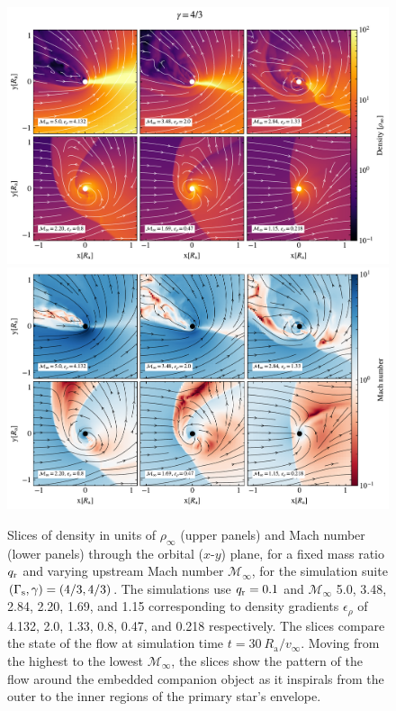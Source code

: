 \begin{figure}[t]%
\centering
\includegraphics[width=13.8cm]{figures/common_envelope/sliceplot_gamma_43_q0pt1_varymach_gradient_comparison_figure_z.pdf}
\includegraphics[width=13.8cm]{figures/common_envelope/sliceplot_gamma_43_q0pt1_varymach_mach_gradient_comparison_figure_z.pdf}
\caption{Slices of density in units of $\rho_\infty$ (upper panels) and Mach number (lower panels) through the orbital ($x$-$y$) plane, for a fixed mass ratio $q_{\rm r}$ and varying upstream Mach number $\mathcal{M}_\infty$, for the simulation suite $(\Gamma_{\rm s}, \gamma) = (4/3, 4/3)$. The simulations use $q_{\rm r} = 0.1$ and $\mathcal{M}_\infty$ 5.0, 3.48, 2.84, 2.20, 1.69, and 1.15 corresponding to density gradients $\epsilon_\rho$ of 4.132, 2.0, 1.33, 0.8, 0.47, and 0.218 respectively. The slices compare the state of the flow at simulation time $t = 30~R_{\mathrm{a}}/v_\infty$. Moving from the highest to the lowest $\mathcal{M}_\infty$, the slices show the pattern of the flow around the embedded companion object as it inspirals from the outer to the inner regions of the primary star's envelope.  
\label{fig:sims_g43_fix_q_vary_mach}}
\end{figure}

